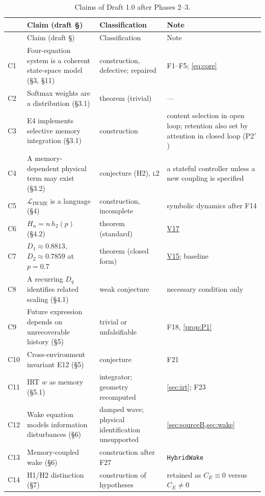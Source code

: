 \documentclass[11pt]{article}
\theoremstyle{definition}
\theoremstyle{remark}
\newcommand{\lvl}[1]{\textsc{l}#1}
\newcommand{\code}[1]{\texttt{#1}}
\newcommand{\V}[1]{\hyperref[app:verify]{\textsf{#1}}}
\begin{document}
\begin{longtable}{@{}>{\raggedright\arraybackslash}p{0.75cm}>{\raggedright\arraybackslash}p{6.0cm}>{\raggedright\arraybackslash}p{4.2cm}>{\raggedright\arraybackslash}p{4.0cm}@{}}
\caption{Claims of Draft 1.0 after Phases 2--3.}\label{tab:ledger}\\
\toprule
& Claim (draft \S) & Classification & Note \\
\midrule\endfirsthead
\toprule & Claim (draft \S) & Classification & Note \\ \midrule\endhead
C1 & Four-equation system is a coherent state-space model (\S3, \S11) & construction, defective; repaired & F1--F5; \eqref{eq:core} \\
C2 & Softmax weights are a distribution (\S3.1) & theorem (trivial) & --- \\
C3 & E4 implements selective memory integration (\S3.1) & construction & content selection in open loop; retention also set by attention in closed loop (P2$'$) \\
C4 & A memory-dependent physical term may exist (\S3.2) & conjecture (H2), \lvl{2} & a stateful controller unless a new coupling is specified \\
C5 & $\mathcal L_{\mathrm{IWME}}$ is a language (\S4) & construction, incomplete & symbolic dynamics after F14 \\
C6 & $H_n=n\,h_2(p)$ (\S4.2) & theorem (standard) & \V{V17} \\
C7 & $D_1\approx0.8813$, $D_2\approx0.7859$ at $p=0.7$ & theorem (closed form) & \V{V15}; baseline \\
C8 & A recurring $D_q$ identifies related scaling (\S4.1) & weak conjecture & necessary condition only \\
C9 & Future expression depends on unrecoverable history (\S5) & trivial or unfalsifiable & F18, \cref{prop:P1} \\
C10 & Cross-environment invariant E12 (\S5) & conjecture & F21 \\
C11 & IRT $w$ as memory (\S5.1) & integrator; geometry recomputed & \cref{sec:irt}; F23 \\
C12 & Wake equation models information disturbances (\S6) & damped wave; physical identification unsupported & \cref{sec:sourceB,sec:wake} \\
C13 & Memory-coupled wake (\S6) & construction after F27 & \code{HybridWake} \\
C14 & H1/H2 distinction (\S7) & construction of hypotheses & retained as $C_E\equiv0$ versus $C_E\ne0$ \\

\end{longtable}
\end{document}
